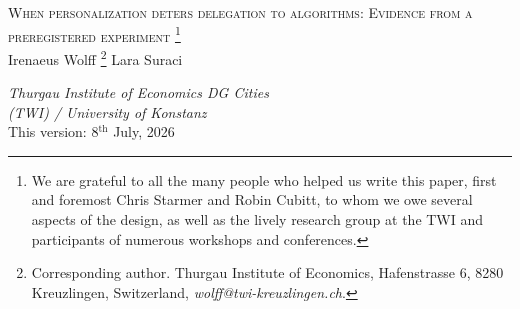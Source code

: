 \documentclass[a4paper, 12pt, fleqn]{article}
\title{\mytitle}
\date{}
\theoremstyle{definition}
\newcommand{\symbolfootnote}[1]{\begingroup%
\renewcommand{\thefootnote}{\fnsymbol{footnote}}\footnote{#1}\endgroup}
\newcommand{\mytitle}{{\Large \textsc{When personalization deters delegation to algorithms: Evidence from a preregistered experiment}}}
\begin{document}
 
\thispagestyle{empty}
\begin{center}
	\mytitle\symbolfootnote{We are grateful to all the many people who helped us write this paper, first and foremost Chris Starmer and Robin Cubitt, to whom we owe several aspects of the design, as well as the lively research group at the TWI and participants of numerous workshops and conferences.}
  \vspace{.55cm}\\
 Irenaeus Wolff\symbolfootnote{Corresponding author. Thurgau Institute of Economics, Hafenstrasse 6, 8280 Kreuzlingen, Switzerland, \textit{wolff@twi-kreuzlingen.ch}.} \qquad\qquad\qquad Lara Suraci
\\\vspace{.25cm}
 \begin{small}
  \textit{Thurgau Institute of Economics\phantom{text} \qquad\qquad DG Cities\phantom{moretext} \\ (TWI) / University of Konstanz \qquad\qquad \phantom{moretext University} } %
  \vspace{.03cm}\\
\vspace{.6cm}
 {This version: 8$^{\text{th}}$ July, 2026}
\vspace{.6cm}
\end{small}
\end{center}
\end{document}
